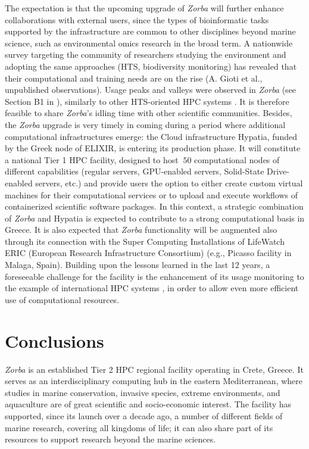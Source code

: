    The expectation is that the upcoming upgrade of \textit{Zorba} will further enhance collaborations with external users, since the types of bioinformatic tasks supported by the infrastructure are common to other disciplines beyond marine science, such as environmental omics research in the broad term. 
   A nationwide survey targeting the community of researchers studying the environment and adopting the same approaches (HTS, biodiversity monitoring) has revealed that their computational and training needs are on the rise (A. Gioti et al., unpublished observations). 
   Usage peaks and valleys were observed in \textit{Zorba} (see Section B1 in \citep{haris_zafeiropoulos_2021_4665308}), similarly to other HTS-oriented HPC systems \citep{lampa2013lessons}. 
   It is therefore feasible to share \textit{Zorba}'s idling time with other scientific communities.
   Besides, the \textit{Zorba} upgrade is very timely in coming during a period where additional computational infrastructures emerge: 
   the Cloud infrastructure Hypatia, funded by the Greek node of ELIXIR, is entering its production phase. 
   It will constitute a national Tier 1 HPC facility, designed to host $~50$ computational nodes of different capabilities (regular servers, GPU-enabled servers, Solid-State Drive-enabled servers, etc.) and provide users the option to either create custom virtual machines for their computational services or to upload and execute workflows of containerized scientific software packages. 
   In this context, a strategic combination of \textit{Zorba} and Hypatia is expected to contribute to a strong computational basis in Greece. 
   It is also expected that \textit{Zorba} functionality will be augmented also through its connection with the Super Computing Installations of LifeWatch ERIC (European Research Infrastructure Consortium) (e.g., Picasso facility in Malaga, Spain). 
   Building upon the lessons learned in the last 12 years, a foreseeable challenge for the facility is the enhancement of its usage monitoring to the example of international HPC systems \citep{dahlo2018tracking}, in order to allow even more efficient use of computational resources.



   \section{Conclusions}

   \textit{Zorba} is an established Tier 2 HPC regional facility operating in Crete, Greece. 
   It serves as an interdisciplinary computing hub in the eastern Mediterranean, where studies in marine conservation, invasive species, extreme environments, and aquaculture are of great scientific and socio-economic interest. 
   The facility has supported, since its launch over a decade ago, a number of different fields of marine research, covering all kingdoms of life; 
   it can also share part of its resources to support research beyond the marine sciences.

